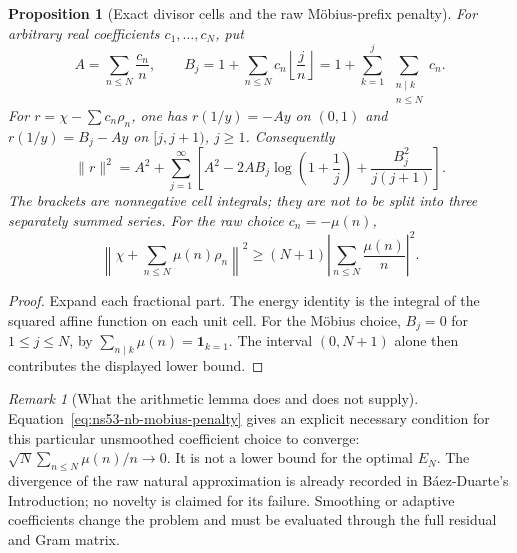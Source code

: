 \documentclass[11pt]{article}
\newtheorem{proposition}[theorem]{Proposition}
\theoremstyle{remark}
\newtheorem{remark}[theorem]{Remark}
\begin{document}
\begin{proposition}[Exact divisor cells and the raw M\"obius-prefix penalty]
\label{prop:ns53-nb-divisor-cells}
For arbitrary real coefficients $c_1,\ldots,c_N$, put
\[
 A=\sum_{n\leq N}\frac{c_n}{n},\qquad
 B_j=1+\sum_{n\leq N}c_n\left\lfloor\frac jn\right\rfloor
     =1+\sum_{k=1}^j\ \sum_{\substack{n\mid k\\n\leq N}}c_n.
\]
For $r=\chi-\sum c_n\rho_n$, one has $r(1/y)=-Ay$ on $(0,1)$
and $r(1/y)=B_j-Ay$ on $[j,j+1)$, $j\geq1$. Consequently
\begin{equation}
 \|r\|^2=A^2+\sum_{j=1}^{\infty}
 \left[A^2-2AB_j\log\left(1+\frac1j\right)
          +\frac{B_j^2}{j(j+1)}\right].
 \label{eq:ns53-nb-divisor-energy}
\end{equation}
The brackets are nonnegative cell integrals; they are not to be split
into three separately summed series. For the raw choice $c_n=-\mu(n)$,
\begin{equation}
 \left\|\chi+\sum_{n\leq N}\mu(n)\rho_n\right\|^2
 \geq (N+1)\left|\sum_{n\leq N}\frac{\mu(n)}n\right|^2.
 \label{eq:ns53-nb-mobius-penalty}
\end{equation}
\end{proposition}

\begin{proof}
Expand each fractional part. The energy identity is the integral of the
squared affine function on each unit cell. For the M\"obius choice,
$B_j=0$ for $1\leq j\leq N$, by
$\sum_{n\mid k}\mu(n)=\mathbf 1_{k=1}$. The interval $(0,N+1)$ alone
then contributes the displayed lower bound.
\end{proof}

\begin{remark}[What the arithmetic lemma does and does not supply]
Equation~\eqref{eq:ns53-nb-mobius-penalty} gives an explicit necessary
condition for this particular unsmoothed coefficient choice to converge:
$\sqrt N\sum_{n\leq N}\mu(n)/n\to0$. It is not a lower bound for the
optimal $E_N$. The divergence of the raw natural approximation is already
recorded in B\'aez-Duarte's Introduction; no novelty is claimed for its
failure. Smoothing or adaptive coefficients change the problem and must
be evaluated through the full residual and Gram matrix.
\end{remark}
\end{document}
